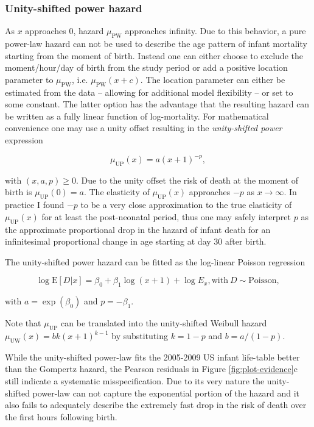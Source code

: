 \documentclass[10pt, twoside, parskip=half]{article}
\begin{document}
\subsubsection*{Unity-shifted power
hazard}\label{unity-shifted-power-hazard}

As \(x\) approaches 0, hazard \(\mu_\text{PW}\) approaches infinity. Due
to this behavior, a pure power-law hazard can not be used to describe
the age pattern of infant mortality starting from the moment of birth.
Instead one can either choose to exclude the moment/hour/day of birth
from the study period \citep[as did][]{Choe1981, Berrut2016} or add a
positive location parameter to \(\mu_\text{PW}\), i.e.
\(\mu_\text{PW}(x+c)\). The location parameter can either be estimated
from the data -- allowing for additional model flexibility -- or set to
some constant. The latter option has the advantage that the resulting
hazard can be written as a fully linear function of log-mortality. For
mathematical convenience one may use a unity offset resulting in the
\emph{unity-shifted power} expression

\[
\mu_\text{UP}(x) = a(x+1)^{-p},
\]

with \((x, a, p)\geq 0\). Due to the unity offset the risk of death at
the moment of birth is \(\mu_\text{UP}(0)=a\). The elasticity of
\(\mu_\text{UP}(x)\) approaches \(-p\) as \(x\rightarrow \infty\). In
practice I found \(-p\) to be a very close approximation to the true
elasticity of \(\mu_\text{UP}(x)\) for at least the post-neonatal
period, thus one may safely interpret \(p\) as the approximate
proportional drop in the hazard of infant death for an infinitesimal
proportional change in age starting at day 30 after birth.

The unity-shifted power hazard can be fitted as the log-linear Poisson
regression

\[
\log\text{E}[D|x] =
\beta_0 + \beta_1\log (x+1) + \log E_x,
\text{with}~D\sim\text{Poisson},
\]

with \(a = \exp(\beta_0)\) and \(p = -\beta_1\).

Note that \(\mu_\text{UP}\) can be translated into the unity-shifted
Weibull hazard \(\mu_\text{UW}(x)=bk(x+1)^{k-1}\) by substituting
\(k=1-p\) and \(b=a/(1-p)\).

While the unity-shifted power-law fits the 2005-2009 US infant
life-table better than the Gompertz hazard, the Pearson residuals in
Figure \ref{fig:plot-evidence}c still indicate a systematic
misspecification. Due to its very nature the unity-shifted power-law can
not capture the exponential portion of the hazard and it also fails to
adequately describe the extremely fast drop in the risk of death over
the first hours following birth.
\end{document}
